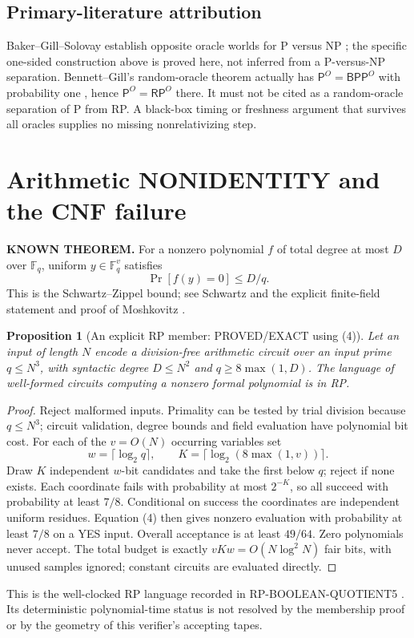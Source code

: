 \documentclass[11pt]{article}
\newtheorem{proposition}[theorem]{Proposition}
\newcommand{\Pclass}{\mathsf P}
\newcommand{\RP}{\mathsf{RP}}
\begin{document}
\subsection*{Primary-literature attribution}
Baker--Gill--Solovay establish opposite oracle worlds for P versus NP
\cite{bgs}; the specific one-sided construction above is proved here, not
inferred from a P-versus-NP separation. Bennett--Gill's random-oracle theorem
actually has $\Pclass^O=\mathsf{BPP}^O$ with probability one \cite{bg}, hence
$\Pclass^O=\RP^O$ there. It must not be cited as a random-oracle separation
of P from RP. A black-box timing or freshness argument that survives all
oracles supplies no missing nonrelativizing step.

\newpage
\section{Arithmetic NONIDENTITY and the CNF failure}
\textbf{KNOWN THEOREM.} For a nonzero polynomial $f$ of total degree at most
$D$ over $\mathbb F_q$, uniform $y\in\mathbb F_q^v$ satisfies
\[
             \Pr[f(y)=0]\le D/q.                      \tag{4}
\]
This is the Schwartz--Zippel bound; see Schwartz and the explicit finite-field
statement and proof of Moshkovitz \cite{schwartz,moshkovitz}.

\begin{proposition}[An explicit RP member: PROVED/EXACT using (4)]
Let an input of length $N$ encode a division-free arithmetic circuit over an
input prime $q\le N^3$, with syntactic degree $D\le N^2$ and
$q\ge8\max(1,D)$. The language of well-formed circuits computing a nonzero
formal polynomial is in RP.
\end{proposition}
\begin{proof}
Reject malformed inputs. Primality can be tested by trial division because
$q\le N^3$; circuit validation, degree bounds and field evaluation have
polynomial bit cost. For each of the $v=O(N)$ occurring variables set
\[
 w=\lceil\log_2q\rceil,\qquad
 K=\lceil\log_2(8\max(1,v))\rceil.
\]
Draw $K$ independent $w$-bit candidates and take the first below $q$; reject
if none exists. Each coordinate fails with probability at most $2^{-K}$,
so all succeed with probability at least $7/8$. Conditional on success the
coordinates are independent uniform residues. Equation (4) then gives
nonzero evaluation with probability at least $7/8$ on a YES input. Overall
acceptance is at least $49/64$. Zero polynomials never accept.
The total budget is exactly $vKw=O(N\log^2N)$ fair bits, with unused samples
ignored; constant circuits are evaluated directly.
\end{proof}
This is the well-clocked RP language recorded in RP-BOOLEAN-QUOTIENT5
\cite{boolean}. Its deterministic polynomial-time status is not resolved by
the membership proof or by the geometry of this verifier's accepting tapes.
\end{document}
